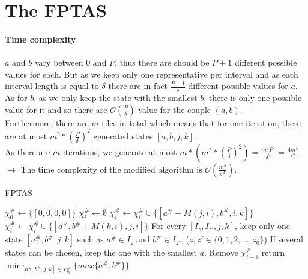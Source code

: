 \documentclass[a4paper, 11pt]{report}
\begin{document}
\newpage


\section{The FPTAS}

\paragraph{Time complexity} $a$ and $b$ vary between $0$ and $P$, thus there are should be $P + 1$ different possible values for each. But as we keep only one representative per interval and as each interval length is equal to $\delta$ there are in fact $\frac{P + 1}{\delta}$ different possible values for $a$. As for $b$, as we only keep the state with the smallest $b$, there is only one possible value for it and so there are $\mathcal{O}(\frac{P}{\delta})$ value for the couple $(a,b)$.\\
Furthermore, there are $m$ tiles in total which means that for one iteration, there are at most $m^2 * (\frac{P}{\delta})^2$ generated states $[a, b, j, k]$.\\
As there are $m$ iterations, we generate at most $m * (m^2 * (\frac{P}{\delta})^2) =  \frac{m^3 P^2}{\delta ^2} = \frac{4 m^5}{\epsilon ^2}$. \\
$\rightarrow$ The time complexity of the modified algorithm is $ \mathcal{O}(\frac{m^5}{\epsilon ^2})$.

\begin{algorithm}[H]
	\caption {FPTAS}
	\begin{algorithmic}
		\State $\chi_0^{\#} \leftarrow \{[0, 0, 0, 0]\}$
		  
		\State $\chi_i^{\#} \leftarrow \emptyset$
		\State $\chi_i^{\#} \leftarrow \chi_i^{\#} \cup \{ [a^{\#} + M(j,i), b^{\#}, i, k] \}$ 
		\State $\chi_i^{\#} \leftarrow \chi_i^{\#} \cup \{ [a^{\#}, b^{\#} + M(k,i), j, i] \}$ 
		\EndFor
		\State For every $[I_z, I_{z'}, j, k]$, keep only one state $[a^{\#}, b^{\#}, j, k]$ such as $a^{\#} \in I_z$ and $b^{\#} \in I_{z'}$. ($z, z' \in \{0, 1, 2, ..., z_0 \}$)
		If several states can be chosen, keep the one with the smallest $a$.
		\State Remove $\chi_{i-1}^{\#} $
		\EndFor
		\State return $ \min_{ [a^{\#}, b^{\#}, j, k] \in \chi_m^{\#} } \{ max\{a^{\#}, b^{\#}\} \}$
	\end{algorithmic}
	\label{FPTAS_algo}
\end{algorithm}
\end{document}
